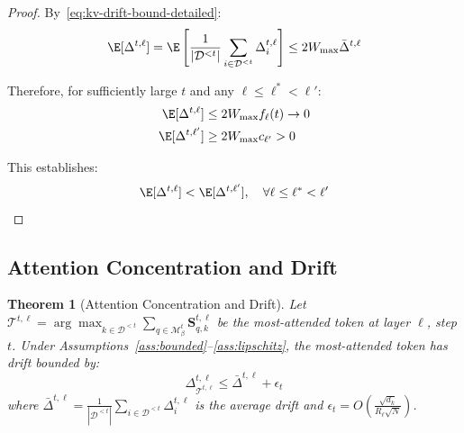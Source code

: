\documentclass{article} %
\newtheorem{theorem}{Theorem}[section]
\theoremstyle{definition}
\theoremstyle{remark}
\begin{document}
\begin{proof}
By~\eqref{eq:kv-drift-bound-detailed}:
\begin{equation}
\E[\Delta^{t,\ell}] = \E\left[\frac{1}{|\mathcal{D}^{<t}|}\sum_{i \in \mathcal{D}^{<t}} \Delta^{t,\ell}_i\right] \leq 2W_{\max} \bar{\Delta}^{t,\ell}
\end{equation}

Therefore, for sufficiently large $t$ and any $\ell \leq \ell^* < \ell'$:
\begin{align}
\E[\Delta^{t,\ell}] &\leq 2W_{\max} f_{\ell}(t) \to 0\\
\E[\Delta^{t,\ell'}] &\geq 2W_{\max} c_{\ell'} > 0
\end{align}

This establishes:
\begin{equation}
\E[\Delta^{t,\ell}] < \E[\Delta^{t,\ell'}], \quad \forall \ell \leq \ell^* < \ell'
\end{equation}
\end{proof}


\subsection{Attention Concentration and Drift}
\label{sec:attn_conc_drift}

\begin{theorem}[Attention Concentration and Drift]\label{thm:attention-drift}
Let $\mathcal{T}^{t,\ell} = \arg\max_{k \in \mathcal{D}^{<t}} \sum_{q \in \mathcal{M}^t_\beta} \mathbf{S}^{t,\ell}_{q,k}$ be the most-attended token at layer $\ell$, step $t$. Under Assumptions~\ref{ass:bounded}--\ref{ass:lipschitz}, the most-attended token has drift bounded by:
\begin{equation}
\Delta^{t,\ell}_{\mathcal{T}^{t,\ell}} \leq \bar{\Delta}^{t,\ell} + \epsilon_t
\end{equation}
where $\bar{\Delta}^{t,\ell} = \frac{1}{|\mathcal{D}^{<t}|}\sum_{i \in \mathcal{D}^{<t}} \Delta^{t,\ell}_i$ is the average drift and $\epsilon_t = O\left(\frac{\sqrt{d_k}}{R_\ell\sqrt{N}}\right)$.
\end{theorem}
\end{document}

